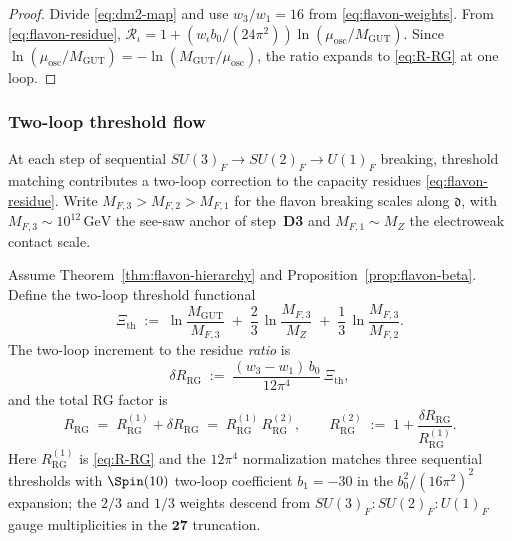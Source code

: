 \begin{proof}
Divide \eqref{eq:dm2-map} and use $w_3/w_1=16$ from \eqref{eq:flavon-weights}.
From \eqref{eq:flavon-residue},
$\mathcal{R}_\iota=1+(w_\iota b_0/(24\pi^2))\ln(\mu_{\mathrm{osc}}/M_{\mathrm{GUT}})$.
Since $\ln(\mu_{\mathrm{osc}}/M_{\mathrm{GUT}})=
-\ln(M_{\mathrm{GUT}}/\mu_{\mathrm{osc}})$, the ratio expands to
\eqref{eq:R-RG} at one loop.
\end{proof}

\subsubsection{Two-loop threshold flow}

At each step of sequential $SU(3)_F\to SU(2)_F\to U(1)_F$ breaking,
threshold matching contributes a two-loop correction to the capacity
residues \eqref{eq:flavon-residue}. Write $M_{F,3}>M_{F,2}>M_{F,1}$ for
the flavon breaking scales along $\mathfrak{d}$, with
$M_{F,3}\sim 10^{12}\,\mathrm{GeV}$ the see-saw anchor of step~\textbf{D3}
and $M_{F,1}\sim M_Z$ the electroweak contact scale.

\begin{proposition}
\label{prop:flavon-beta-2loop}
Assume Theorem~\ref{thm:flavon-hierarchy} and Proposition~\ref{prop:flavon-beta}.
Define the two-loop threshold functional
\begin{equation}\label{eq:Xi-th}
  \Xi_{\mathrm{th}}
  \;:=\;
  \ln\!\frac{M_{\mathrm{GUT}}}{M_{F,3}}
  \;+\;
  \frac{2}{3}\,\ln\!\frac{M_{F,3}}{M_Z}
  \;+\;
  \frac{1}{3}\,\ln\!\frac{M_{F,3}}{M_{F,2}}.
\end{equation}
The two-loop increment to the residue \emph{ratio} is
\begin{equation}\label{eq:delta-R-RG-def}
  \delta R_{\mathrm{RG}}
  \;:=\;
  \frac{(w_3-w_1)\,b_0}{12\pi^4}\,\Xi_{\mathrm{th}},
\end{equation}
and the total RG factor is
\begin{equation}\label{eq:flavon-residue-2loop}
  R_{\mathrm{RG}}
  \;=\;
  R_{\mathrm{RG}}^{(1)} + \delta R_{\mathrm{RG}}
  \;=\;
  R_{\mathrm{RG}}^{(1)}\,R_{\mathrm{RG}}^{(2)},
  \qquad
  R_{\mathrm{RG}}^{(2)}
  \;:=\;
  1 + \frac{\delta R_{\mathrm{RG}}}{R_{\mathrm{RG}}^{(1)}}.
\end{equation}
Here $R_{\mathrm{RG}}^{(1)}$ is \eqref{eq:R-RG} and the $12\pi^4$ normalization
matches three sequential thresholds with $\Spin(10)$ two-loop coefficient
$b_1=-30$ in the $b_0^2/(16\pi^2)^2$ expansion; the $2/3$ and $1/3$ weights
descend from $SU(3)_F:SU(2)_F:U(1)_F$ gauge multiplicities in the
$\mathbf{27}$ truncation.
\end{proposition}

